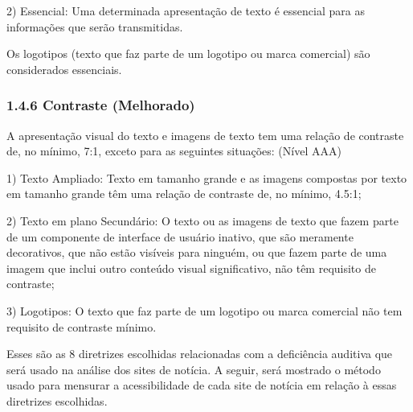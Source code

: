 \documentclass[a4paper]{article}
\begin{document}
\begin{titlepage}
\hspace{.1\textwidth} %
\begin{minipage}{.85\textwidth}
	2) Essencial: Uma determinada apresentação de texto é essencial para as informações que serão transmitidas.\\
\end{minipage}

Os logotipos (texto que faz parte de um logotipo ou marca comercial) são considerados essenciais.

\subsubsection{1.4.6 Contraste (Melhorado)}

A apresentação visual do texto e imagens de texto tem uma relação de contraste de, no mínimo, 7:1, exceto para as seguintes situações: (Nível AAA)\\

\hspace{.1\textwidth} %
\begin{minipage}{.85\textwidth}
	1) Texto Ampliado: Texto em tamanho grande e as imagens compostas por texto em tamanho grande têm uma relação de contraste de, no mínimo, 4.5:1;\\
\end{minipage}

\hspace{.1\textwidth} %
\begin{minipage}{.85\textwidth}
	2) Texto em plano Secundário: O texto ou as imagens de texto que fazem parte de um componente de interface de usuário inativo, que são meramente decorativos, que não estão visíveis para ninguém, ou que fazem parte de uma imagem que inclui outro conteúdo visual significativo, não têm requisito de contraste;\\
\end{minipage}

\hspace{.1\textwidth} %
\begin{minipage}{.85\textwidth}
	3) Logotipos: O texto que faz parte de um logotipo ou marca comercial não tem requisito de contraste mínimo.\\
\end{minipage}

Esses são as 8 diretrizes escolhidas relacionadas com a deficiência auditiva que será usado na análise dos sites de notícia. A seguir, será mostrado o método usado para mensurar a acessibilidade de cada site de notícia em relação à essas diretrizes escolhidas.


\end{titlepage}
\end{document}
